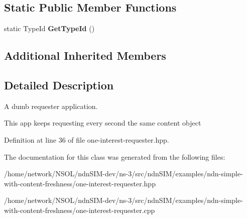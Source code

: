 \subsection*{Static Public Member Functions}
\begin{DoxyCompactItemize}
\item 
static Type\+Id {\bfseries Get\+Type\+Id} ()\hypertarget{classns3_1_1OneInterestRequester_afaf5b63356d43c18cf579ae1a24c26d9}{}\label{classns3_1_1OneInterestRequester_afaf5b63356d43c18cf579ae1a24c26d9}

\end{DoxyCompactItemize}
\subsection*{Additional Inherited Members}


\subsection{Detailed Description}
A dumb requester application. 

This app keeps requesting every second the same content object 

Definition at line 36 of file one-\/interest-\/requester.\+hpp.



The documentation for this class was generated from the following files\+:\begin{DoxyCompactItemize}
\item 
/home/network/\+N\+S\+O\+L/ndn\+S\+I\+M-\/dev/ns-\/3/src/ndn\+S\+I\+M/examples/ndn-\/simple-\/with-\/content-\/freshness/one-\/interest-\/requester.\+hpp\item 
/home/network/\+N\+S\+O\+L/ndn\+S\+I\+M-\/dev/ns-\/3/src/ndn\+S\+I\+M/examples/ndn-\/simple-\/with-\/content-\/freshness/one-\/interest-\/requester.\+cpp\end{DoxyCompactItemize}
